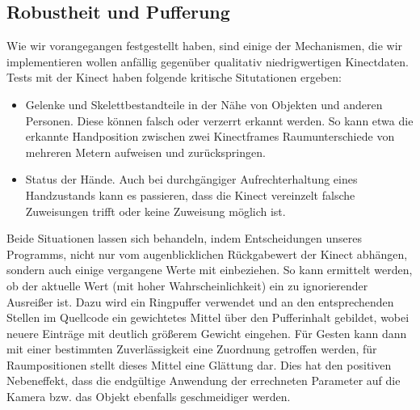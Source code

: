 	\subsection{Robustheit und Pufferung}
	Wie wir vorangegangen festgestellt haben, sind einige der Mechanismen, die wir implementieren wollen anfällig gegenüber qualitativ niedrigwertigen Kinectdaten. Tests mit der Kinect haben folgende kritische Situtationen ergeben:
	\begin{itemize}
		\item Gelenke und Skelettbestandteile in der Nähe von Objekten und anderen Personen. Diese können falsch oder verzerrt erkannt werden. So kann etwa die erkannte Handposition zwischen zwei Kinectframes Raumunterschiede von mehreren Metern aufweisen und zurückspringen.
		\item Status der Hände. Auch bei durchgängiger Aufrechterhaltung eines Handzustands kann es passieren, dass die Kinect vereinzelt falsche Zuweisungen trifft oder keine Zuweisung möglich ist.
	\end{itemize}
	Beide Situationen lassen sich behandeln, indem Entscheidungen unseres Programms, nicht nur vom augenblicklichen Rückgabewert der Kinect abhängen, sondern auch einige vergangene Werte mit einbeziehen. So kann ermittelt werden, ob der aktuelle Wert (mit hoher Wahrscheinlichkeit) ein zu ignorierender Ausreißer ist. Dazu wird ein Ringpuffer verwendet und an den entsprechenden Stellen im Quellcode ein gewichtetes Mittel über den Pufferinhalt gebildet, wobei neuere Einträge mit deutlich größerem Gewicht eingehen. Für Gesten kann dann mit einer bestimmten Zuverlässigkeit eine Zuordnung getroffen werden, für Raumpositionen stellt dieses Mittel eine Glättung dar. Dies hat den positiven Nebeneffekt, dass die endgültige Anwendung der errechneten Parameter auf die Kamera bzw. das Objekt ebenfalls geschmeidiger werden.